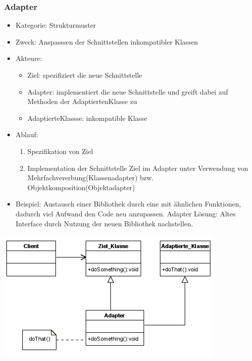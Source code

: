 \documentclass[11pt, fleqn, a4paper, leqno]{scrartcl} %
\begin{document}
		\subsubsection{Adapter}
			\begin{itemize}
				\item Kategorie: Strukturmuster
				\item Zweck: Anspasssen der Schnittstellen inkompatibler Klassen
				\item Akteure: 
				\begin{itemize}
					\item Ziel: spezifiziert die neue Schnittstelle
					\item Adapter: implementiert die neue Schnittstelle und greift dabei auf Methoden der AdaptiertenKlasse zu
					\item AdaptierteKlassse: inkompatible Klasse
				\end{itemize}
				\item Ablauf:
				\begin{enumerate}
					\item Spezifikation von Ziel
					\item Implementation der Schnittstelle Ziel im Adapter unter Verwendung von Mehrfachvererbung(Klassenadapter) bzw. Objektkomposition(Objektadapter)
				\end{enumerate}
				\item Beispiel: Austausch einer Bibliothek durch eine mit ähnlichen Funktionen, dadurch viel Aufwand den Code neu anzupassen. Adapter Lösung: Altes Interface durch Nutzung der neuen Bibliothek nachstellen.
			\end{itemize}
			\includegraphics[scale=0.7]{images/adapter.png}
			\newpage
\end{document}
